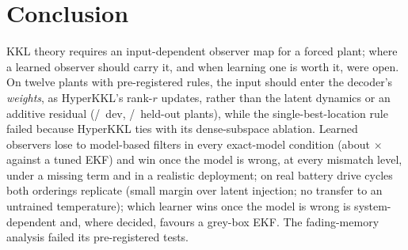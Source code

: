 \section{Conclusion}\label{sec:conclusion}

KKL theory requires an input-dependent observer map for a forced plant; where a learned observer should carry it, and when learning one is worth it, were open. On twelve plants with pre-registered rules, the input should enter the decoder's \emph{weights}, as HyperKKL's rank-$r$ updates, rather than the latent dynamics or an additive residual (\ConeWeightSpaceBeatsLatConcShape/\ConeWeightSpaceBeatsLatConcSeq\ dev, \CtestWeightSpaceBeatsLatConcShape/\CtestWeightSpaceBeatsLatConcSeq\ held-out plants), while the single-best-location rule failed because HyperKKL ties with its dense-subspace ablation. Learned observers lose to model-based filters in every exact-model condition (about \ConeLearnedOverEkfMedianSeq$\times$ against a tuned EKF) and win once the model is wrong, at every mismatch level, under a missing term and in a realistic deployment; on real battery drive cycles both orderings replicate (small margin over latent injection; no transfer to an untrained temperature); which learner wins once the model is wrong is system-dependent and, where decided, favours a grey-box EKF. The fading-memory analysis failed its pre-registered tests.
